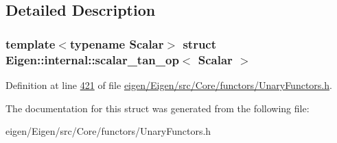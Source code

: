 \subsection{Detailed Description}
\subsubsection*{template$<$typename Scalar$>$\newline
struct Eigen\+::internal\+::scalar\+\_\+tan\+\_\+op$<$ Scalar $>$}



Definition at line \hyperlink{eigen_2_eigen_2src_2_core_2functors_2_unary_functors_8h_source_l00421}{421} of file \hyperlink{eigen_2_eigen_2src_2_core_2functors_2_unary_functors_8h_source}{eigen/\+Eigen/src/\+Core/functors/\+Unary\+Functors.\+h}.



The documentation for this struct was generated from the following file\+:\begin{DoxyCompactItemize}
\item 
eigen/\+Eigen/src/\+Core/functors/\+Unary\+Functors.\+h\end{DoxyCompactItemize}
